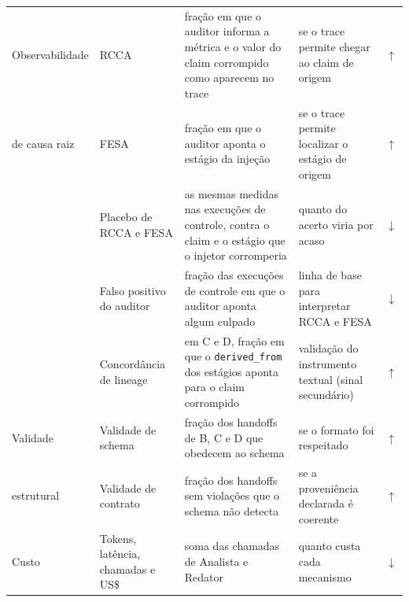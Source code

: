 \begin{table}[t]
\begin{tabular}{|l|>{\raggedright\arraybackslash}p{3.0cm}|>{\raggedright\arraybackslash}p{6.0cm}|>{\raggedright\arraybackslash}p{4.9cm}|c|}
\hline
Observabilidade & RCCA & fração em que o auditor informa a métrica e o valor do claim corrompido como aparecem no trace & se o trace permite chegar ao claim de origem & $\uparrow$ \\
de causa raiz & FESA & fração em que o auditor aponta o estágio da injeção & se o trace permite localizar o estágio de origem & $\uparrow$ \\
 & Placebo de RCCA e FESA & as mesmas medidas nas execuções de controle, contra o claim e o estágio que o injetor corromperia & quanto do acerto viria por acaso & $\downarrow$ \\
 & Falso positivo do auditor & fração das execuções de controle em que o auditor aponta algum culpado & linha de base para interpretar RCCA e FESA & $\downarrow$ \\
 & Concordância de lineage & em C e D, fração em que o \texttt{derived\_from} dos estágios aponta para o claim corrompido & validação do instrumento textual (sinal secundário) & $\uparrow$ \\
\hline
Validade & Validade de schema & fração dos handoffs de B, C e D que obedecem ao schema & se o formato foi respeitado & $\uparrow$ \\
estrutural & Validade de contrato & fração dos handoffs sem violações que o schema não detecta & se a proveniência declarada é coerente & $\uparrow$ \\
\hline
Custo & Tokens, latência, chamadas e US\$ & soma das chamadas de Analista e Redator & quanto custa cada mecanismo & $\downarrow$ \\
\hline
\end{tabular}
\end{table}

